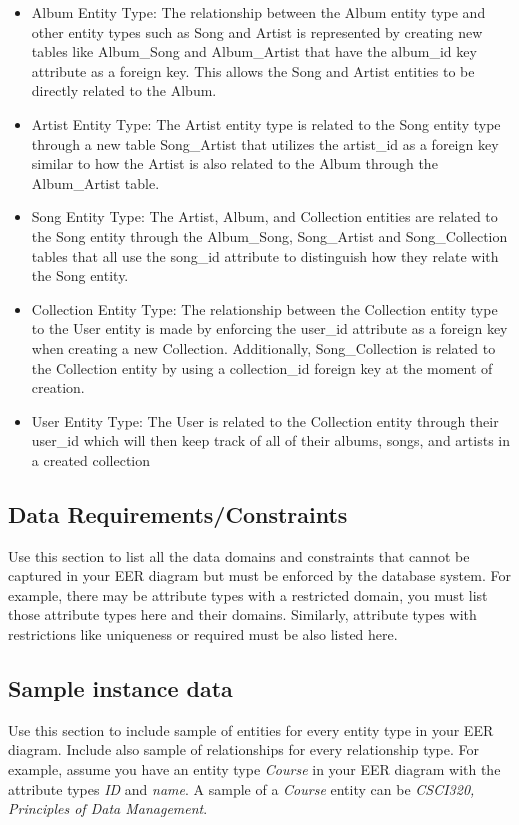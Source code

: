 \documentclass[12pt]{article}
\begin{document}
    \begin{itemize}
        \item Album Entity Type: The relationship between the Album entity type and other entity types such as Song and Artist is represented by creating new tables like Album\_Song and Album\_Artist that have the album\_id key attribute as a foreign key. This allows the Song and Artist entities to be directly related to the Album.
        \item Artist Entity Type: The Artist entity type is related to the Song entity type through a new table Song\_Artist that utilizes the artist\_id as a foreign key similar to how the Artist is also related to the Album through the Album\_Artist table.
        \item Song Entity Type: The Artist, Album, and Collection entities are related to the Song entity through the Album\_Song, Song\_Artist and Song\_Collection tables that all use the song\_id attribute to distinguish how they relate with the Song entity.
        \item Collection Entity Type: The relationship between the Collection entity type to the User entity is made by enforcing the user\_id attribute as a foreign key when creating a new Collection. Additionally, Song\_Collection is related to the Collection entity by using a collection\_id foreign key at the moment of creation.
        \item User Entity Type: The User is related to the Collection entity through their user\_id which will then keep track of all of their albums, songs, and artists in a created collection
    \end{itemize}
%
%
%
%
    \subsection{Data Requirements/Constraints}
    Use this section to list all the data domains and constraints that cannot be captured in your EER diagram but must be enforced by the database system. For example, there may be attribute types with a restricted domain, you must list those attribute types here and their domains. Similarly, attribute types with restrictions like uniqueness or required must be also listed here.
    \subsection{Sample instance data}
    Use this section to include sample of entities for every entity type in your EER diagram. Include also sample of relationships for every relationship type. For example, assume you have an entity type \emph{Course} in your EER diagram with the attribute types \emph{ID} and \emph{name}. A sample of a \emph{Course} entity can be \emph{CSCI320, Principles of Data Management}.\\
\end{document}
